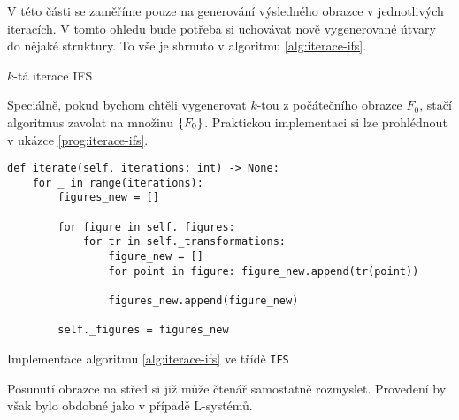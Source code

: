 V této části se zaměříme pouze na generování výsledného obrazce v jednotlivých iteracích. V tomto ohledu bude potřeba si uchovávat nově vygenerované útvary do nějaké struktury. To vše je shrnuto v algoritmu \ref{alg:iterace-ifs}.
\begin{algorithm}[h]
    \;
    \caption{$k$-tá iterace IFS}
    \label{alg:iterace-ifs}
\end{algorithm}
Speciálně, pokud bychom chtěli vygenerovat $k$-tou z počátečního obrazce $F_0$, stačí algoritmus zavolat na množinu $\left\{F_0\right\}$. Praktickou implementaci si lze prohlédnout v ukázce \ref{prog:iterace-ifs}.
\begin{program}[h]
\begin{lstlisting}[style=python]
def iterate(self, iterations: int) -> None:
    for _ in range(iterations):
        figures_new = []
        
        for figure in self._figures:
            for tr in self._transformations:
                figure_new = []
                for point in figure: figure_new.append(tr(point))

                figures_new.append(figure_new)
    
        self._figures = figures_new
\end{lstlisting}
    \caption{Implementace algoritmu \ref{alg:iterace-ifs} ve třídě \texttt{IFS}}
    \label{prog:iterace-ifs}
\end{program}
Posunutí obrazce na střed si již může čtenář samostatně rozmyslet. Provedení by však bylo obdobné jako v případě L-systémů.
